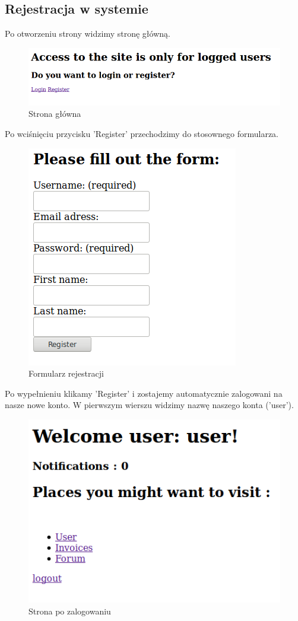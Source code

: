 \documentclass[12pt]{article}
\begin{document}
	\subsection{Rejestracja w systemie}
	Po otworzeniu strony widzimy stronę główną.
	\begin{figure}[H]
		\centering
		\includegraphics[scale=0.5]{img/1.png}
		\caption{Strona główna}
	\end{figure}
	Po wciśnięciu przycisku 'Register' przechodzimy do stosownego formularza.
	\begin{figure}[H]
		\centering
		\includegraphics[scale=0.5]{img/2.png}
		\caption{Formularz rejestracji}
	\end{figure}
	Po wypełnieniu klikamy 'Register' i zostajemy automatycznie zalogowani na nasze nowe konto. W pierwszym wierszu widzimy nazwę naszego konta ('user').
	\begin{figure}[H]
		\centering
		\includegraphics[scale=0.5]{img/3.png}
		\caption{Strona po zalogowaniu}
	\end{figure}
	
\end{document}
